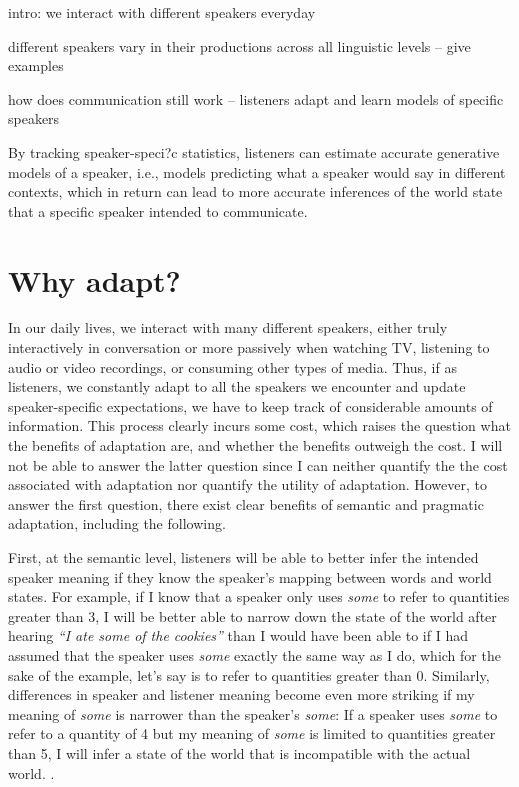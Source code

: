 intro: we interact with different speakers everyday

different speakers vary in their productions across all linguistic levels -- give examples

how does communication still work -- listeners adapt and learn models of specific speakers

By tracking speaker-speci?c statistics, listeners can estimate accurate generative models of a speaker, i.e., models predicting what a speaker would say in different contexts, which in return can lead to more accurate inferences of the world state that a specific speaker intended to communicate.




\section{Why adapt?}

In our daily lives, we interact with many different speakers, either truly interactively in conversation or more passively when watching TV, listening to audio or video recordings, or consuming other types of media. Thus, if as listeners, we constantly adapt to all the speakers we encounter and update speaker-specific expectations, we have to keep track of considerable amounts of information. This process clearly incurs some cost, which raises the question what the benefits of adaptation are, and whether the benefits outweigh the cost. I will not be able to answer the latter question since I can neither quantify the 
the cost associated with adaptation nor quantify the utility of adaptation. However, to answer the first question, there exist clear benefits of semantic and pragmatic adaptation, including the following.

First, at the semantic level, listeners will be able to better infer the intended speaker meaning if they know the speaker's mapping between words and world states. For example, if I know that a speaker only uses \emph{some} to refer to quantities greater than 3, I will be better able to narrow down the state of the world after hearing \emph{``I ate some of the cookies''} than I would have been able to if I had assumed that the speaker uses \emph{some} exactly the same way as I do, which for the sake of the example, let's say is to refer to quantities greater than 0. Similarly, differences in speaker and listener meaning become even more striking if my meaning of \emph{some} is narrower than the speaker's \emph{some}: If a speaker uses \emph{some} to refer to a quantity of 4 but my meaning of \emph{some} is limited to quantities greater than 5, I will infer a state of the world that is incompatible with the actual world. .


